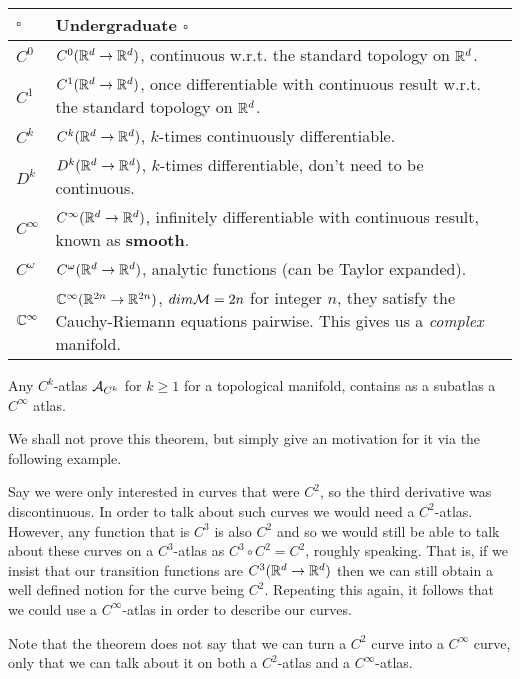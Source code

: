 \begin{center}
	\begin{tabular}{@{} p{2cm}p{10cm}@{}}
		\toprule
		$\square$ & Undergraduate $\square$ \\
		\midrule 
		$C^0$ & $C^0(\mathbb{R}^d\to\mathbb{R}^d)$, continuous w.r.t. the standard topology on $\mathbb{R}^d$. \\
		$C^1$ & $C^1(\mathbb{R}^d\to\mathbb{R}^d)$, once differentiable with continuous result w.r.t. the standard topology on $\mathbb{R}^d$. \\
		$C^k$ & $C^k(\mathbb{R}^d\to\mathbb{R}^d)$, $k$-times continuously differentiable. \\
		$D^k$ & $D^k(\mathbb{R}^d\to\mathbb{R}^d)$, $k$-times  differentiable, don't need to be continuous. \\
		$C^{\infty}$ & $C^{\infty}(\mathbb{R}^d\to\mathbb{R}^d)$, infinitely differentiable with continuous result, known as \textbf{smooth}. \\
		$C^{\omega}$ & $C^{\omega}(\mathbb{R}^d\to\mathbb{R}^d)$, analytic functions (can be Taylor expanded). \\
		$\mathbb{C}^{\infty}$ & $\mathbb{C}^{\infty}(\mathbb{R}^{2n}\to\mathbb{R}^{2n})$, $dim \mathcal{M} = 2n$ for integer $n$, they satisfy the Cauchy-Riemann equations pairwise. This gives us a \textit{complex} manifold. \\
		\bottomrule
	\end{tabular}
\end{center}

    Any $C^k$-atlas $\mathcal{A}_{C^k}$ for $k\geq 1$ for a topological manifold, contains as a subatlas a $C^{\infty}$ atlas. 
\et 

We shall not prove this theorem, but simply give an motivation for it via the following example. 

\bex 
    Say we were only interested in curves that were $C^2$, so the third derivative was discontinuous. In order to talk about such curves we would need a $C^2$-atlas. However, any function that is $C^3$ is also $C^2$ and so we would still be able to talk about these curves on a $C^3$-atlas as $C^3\circ C^2 = C^2$, roughly speaking. That is, if we insist that our transition functions are $C^3(\mathbb{R}^d\to\mathbb{R}^d)$ then we can still obtain a well defined notion for the curve being $C^2$. Repeating this again, it follows that we could use a $C^{\infty}$-atlas in order to describe our curves. 
    
    Note that the theorem does not say that we can turn a $C^2$ curve into a $C^{\infty}$ curve, only that we can talk about it on both a $C^2$-atlas and a $C^{\infty}$-atlas. 
\eex 

